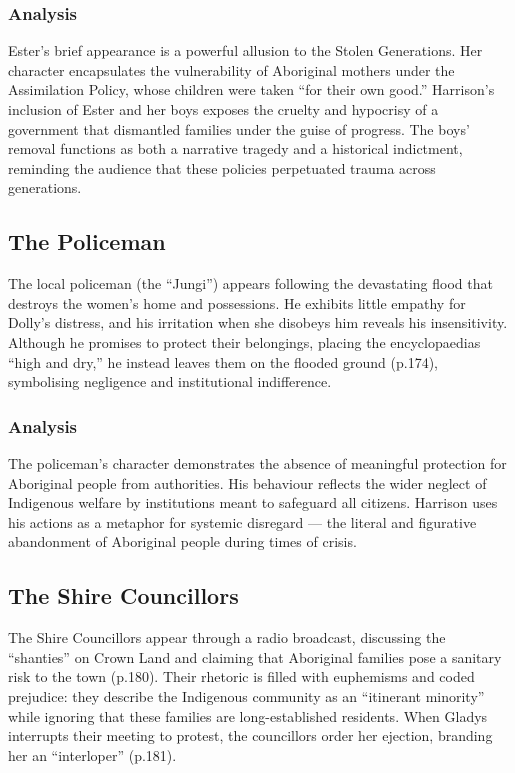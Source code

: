 \documentclass[a4paper]{article}
\begin{document}
\subsubsection{Analysis}
Ester’s brief appearance is a powerful allusion to the Stolen Generations. Her character encapsulates the vulnerability of Aboriginal mothers under the Assimilation Policy, whose children were taken “for their own good.” Harrison’s inclusion of Ester and her boys exposes the cruelty and hypocrisy of a government that dismantled families under the guise of progress. The boys’ removal functions as both a narrative tragedy and a historical indictment, reminding the audience that these policies perpetuated trauma across generations.\\


\subsection{The Policeman}
The local policeman (the “Jungi”) appears following the devastating flood that destroys the women’s home and possessions. He exhibits little empathy for Dolly’s distress, and his irritation when she disobeys him reveals his insensitivity. Although he promises to protect their belongings, placing the encyclopaedias “high and dry,” he instead leaves them on the flooded ground (p.174), symbolising negligence and institutional indifference.\\

\subsubsection{Analysis}
The policeman’s character demonstrates the absence of meaningful protection for Aboriginal people from authorities. His behaviour reflects the wider neglect of Indigenous welfare by institutions meant to safeguard all citizens. Harrison uses his actions as a metaphor for systemic disregard — the literal and figurative abandonment of Aboriginal people during times of crisis.\\


\subsection{The Shire Councillors}
The Shire Councillors appear through a radio broadcast, discussing the “shanties” on Crown Land and claiming that Aboriginal families pose a sanitary risk to the town (p.180). Their rhetoric is filled with euphemisms and coded prejudice: they describe the Indigenous community as an “itinerant minority” while ignoring that these families are long-established residents. When Gladys interrupts their meeting to protest, the councillors order her ejection, branding her an “interloper” (p.181).\\
\end{document}
